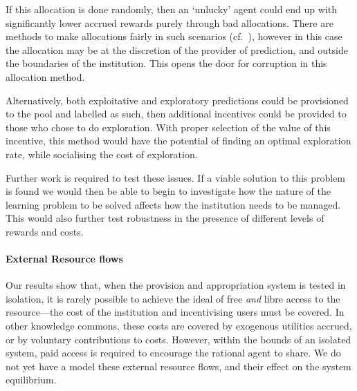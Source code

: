 If this allocation is done randomly, then an `unlucky' agent could end up with
significantly lower accrued rewards purely through bad allocations. There are methods
to make allocations fairly in such scenarios (cf.~\citet{Pitt2014}), however
in this case the allocation may be at the discretion of the provider of prediction,
and outside the boundaries of the institution. This opens the door for
corruption in this allocation method.

Alternatively, both exploitative and exploratory predictions could be
provisioned to the pool and labelled as such, then additional incentives could
be provided to those who chose to do exploration. With proper selection of the
value of this incentive, this method would have the potential of finding an
optimal exploration rate, while socialising the cost of exploration.

Further work is required to test these issues.
If a viable solution to this problem is found we would then be able
to begin to investigate how the nature of the learning problem to be solved
affects how the institution needs to be managed. This would also further test
robustness in the presence of different levels of rewards and costs.

\paragraph{External Resource flows}
Our results show that, when the provision and appropriation system is tested in
isolation, it is rarely possible to achieve the ideal of free \emph{and} libre
access to the resource---the cost of the institution and incentivising users
must be covered. In other knowledge commons, these costs are covered by
exogenous utilities accrued, or by voluntary contributions to costs. However,
within the bounds of an isolated system, paid access is required to encourage the
rational agent to share. We do not yet have a model these external resource
flows, and their effect on the system equilibrium.


